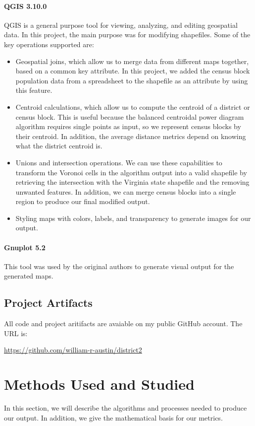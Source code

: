 \documentclass[11pt]{article}
\begin{document}
\paragraph{QGIS 3.10.0} QGIS is a general purpose tool for viewing, analyzing, and editing geospatial data. In this project, the main purpose was for modifying shapefiles. Some of the key operations supported are:
\begin{itemize}
	\item Geospatial joins, which allow us to merge data from different maps together, based on a common key attribute. In this project, we added the census block population data from a spreadsheet to the shapefile as an attribute by using this feature.
	\item Centroid calculations, which allow us to compute the centroid of a district or census block. This is useful because the balanced centroidal power diagram algorithm requires single points as input, so we represent census blocks by their centroid. In addition, the average distance metrics depend on knowing what the district centroid is.
	\item Unions and intersection operations. We can use these capabilities to transform the Voronoi cells in the algorithm output into a valid shapefile by retrieving the intersection with the Virginia state shapefile and the removing unwanted features. In addition, we can merge census blocks into a single region to produce our final modified output.
	\item Styling maps with colors, labels, and transparency to generate images for our output.
\end{itemize}

\paragraph{Gnuplot 5.2} This tool was used by the original authors to generate visual output for the generated maps.


\subsection{Project Artifacts}
All code and project aritifacts are avaiable on my public GitHub account. The URL is:

\begin{center}
	\url{https://github.com/william-r-austin/district2}
\end{center}

\section{Methods Used and Studied}
In this section, we will describe the algorithms and processes needed to produce our output. In addition, we give the mathematical basis for our metrics. 
\end{document}
